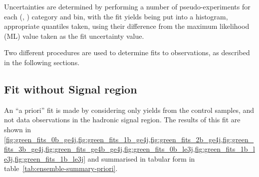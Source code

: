 Uncertainties are determined by performing a number of pseudo-experiments for
each (\nb, \nj) category and \HT bin, with the fit yields being put into a
histogram, appropriate quantiles taken, using their difference from the maximum 
likelihood (ML) value taken as the fit uncertainty value.

Two different procedures are used to determine fits to observations, as described
in the following sections.

\subsection{Fit without Signal region}
\label{sec:results_fit_green}
An ``a priori'' fit is made by considering only yields from the control samples,
and not data observations in the hadronic signal region. The results of this fit
are shown in \cref{fig:green_fits_0b_ge4j,fig:green_fits_1b_ge4j,fig:green_fits_2b_ge4j,fig:green_fits_3b_ge4j,fig:green_fits_ge4b_ge4j,fig:green_fits_0b_le3j,fig:green_fits_1b_le3j,fig:green_fits_1b_le3j}
and summarised in tabular form in
table~\ref{tab:ensemble-summary-priori}.

